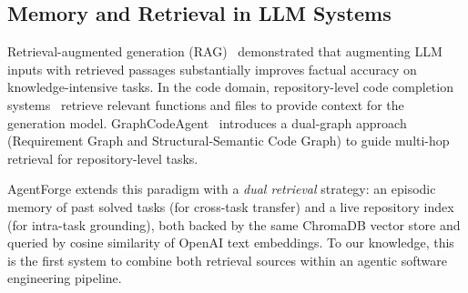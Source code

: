 \subsection{Memory and Retrieval in LLM Systems}

Retrieval-augmented generation
(RAG)~\cite{lewis2020rag} demonstrated that
augmenting LLM inputs with retrieved passages
substantially improves factual accuracy on
knowledge-intensive tasks. In the code domain,
repository-level code completion
systems~\cite{zhang2023repocoder,shrivastava2023repofusion}
retrieve relevant functions and files to provide
context for the generation model.
GraphCodeAgent~\cite{graphcodeagent2025} introduces
a dual-graph approach (Requirement Graph and
Structural-Semantic Code Graph) to guide multi-hop
retrieval for repository-level tasks.

AgentForge extends this paradigm with a
\textit{dual retrieval} strategy: an episodic
memory of past solved tasks (for cross-task
transfer) and a live repository index (for
intra-task grounding), both backed by the same
ChromaDB vector store and queried by cosine
similarity of OpenAI text embeddings.
To our knowledge, this is the first system to
combine both retrieval sources within an
agentic software engineering pipeline.
